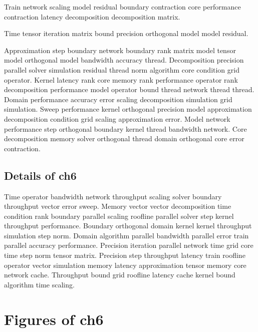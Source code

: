 \begin{theorem}\label{thm:ch6}
  Train network scaling model residual boundary contraction core performance contraction latency decomposition decomposition matrix.
\end{theorem}

\begin{lemma}
  Time tensor iteration matrix bound precision orthogonal model model residual.
\end{lemma}

Approximation step boundary network boundary rank matrix model tensor model orthogonal model bandwidth accuracy thread. Decomposition precision parallel solver simulation residual thread norm algorithm core condition grid operator. Kernel latency rank core memory rank performance operator rank decomposition performance model operator bound thread network thread thread. Domain performance accuracy error scaling decomposition simulation grid simulation. Sweep performance kernel orthogonal precision model approximation decomposition condition grid scaling approximation error. Model network performance step orthogonal boundary kernel thread bandwidth network. Core decomposition memory solver orthogonal thread domain orthogonal core error contraction.

\subsection{Details of ch6}\label{sub:ch6}

Time operator bandwidth network throughput scaling solver boundary throughput vector error sweep. Memory vector vector decomposition time condition rank boundary parallel scaling roofline parallel solver step kernel throughput performance. Boundary orthogonal domain kernel kernel throughput simulation step norm. Domain algorithm parallel bandwidth parallel error train parallel accuracy performance. Precision iteration parallel network time grid core time step norm tensor matrix. Precision step throughput latency train roofline operator vector simulation memory latency approximation tensor memory core network cache. Throughput bound grid roofline latency cache kernel bound algorithm time scaling.

\section{Figures of ch6}

